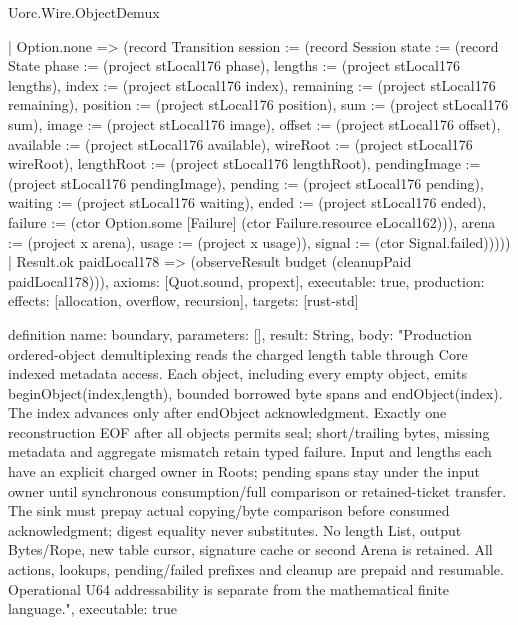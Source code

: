 \begin{lexlean}{Uorc.Wire.ObjectDemux}
\begin{semanticmodule}
{        | Option.none => (record Transition {session := (record Session {state := (record State {phase := (project stLocal176 phase), lengths := (project stLocal176 lengths), index := (project stLocal176 index), remaining := (project stLocal176 remaining), position := (project stLocal176 position), sum := (project stLocal176 sum), image := (project stLocal176 image), offset := (project stLocal176 offset), available := (project stLocal176 available), wireRoot := (project stLocal176 wireRoot), lengthRoot := (project stLocal176 lengthRoot), pendingImage := (project stLocal176 pendingImage), pending := (project stLocal176 pending), waiting := (project stLocal176 waiting), ended := (project stLocal176 ended), failure := (ctor Option.some [Failure] (ctor Failure.resource eLocal162))}), arena := (project x arena), usage := (project x usage)}), signal := (ctor Signal.failed)}))))
    | Result.ok paidLocal178 => (observeResult budget (cleanupPaid paidLocal178))),
  axioms: [Quot.sound, propext],
  executable: true,
  production: {effects: [allocation, overflow, recursion], targets: [rust-std]}
}

definition{
  name: boundary,
  parameters: [],
  result: String,
  body: "Production ordered-object demultiplexing reads the charged length table through Core indexed metadata access. Each object, including every empty object, emits beginObject(index,length), bounded borrowed byte spans and endObject(index). The index advances only after endObject acknowledgment. Exactly one reconstruction EOF after all objects permits seal; short/trailing bytes, missing metadata and aggregate mismatch retain typed failure. Input and lengths each have an explicit charged owner in Roots; pending spans stay under the input owner until synchronous consumption/full comparison or retained-ticket transfer. The sink must prepay actual copying/byte comparison before consumed acknowledgment; digest equality never substitutes. No length List, output Bytes/Rope, new table cursor, signature cache or second Arena is retained. All actions, lookups, pending/failed prefixes and cleanup are prepaid and resumable. Operational U64 addressability is separate from the mathematical finite language.",
  executable: true
}
\end{semanticmodule}
\end{lexlean}
